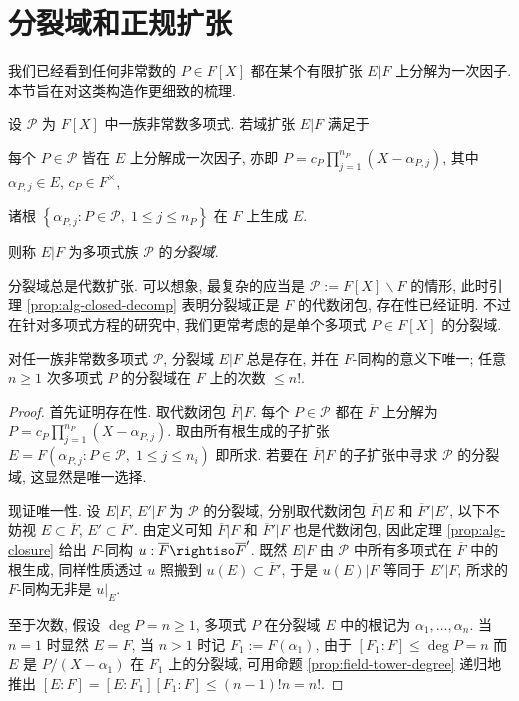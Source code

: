 \section{分裂域和正规扩张}\label{sec:splitting-field}
我们已经看到任何非常数的 $P \in F[X]$ 都在某个有限扩张 $E|F$ 上分解为一次因子. 本节旨在对这类构造作更细致的梳理.

\begin{definition}
	设 $\mathcal{P}$ 为 $F[X]$ 中一族非常数多项式. 若域扩张 $E|F$ 满足于
	\begin{compactitem}
		\item 每个 $P \in \mathcal{P}$ 皆在 $E$ 上分解成一次因子, 亦即 $P = c_P \prod_{j=1}^{n_P}(X - \alpha_{P,j})$, 其中 $\alpha_{P,j} \in E$, $c_P \in F^\times$,
		\item 诸根 $\left\{ \alpha_{P,j} : P \in \mathcal{P},\; 1 \leq j \leq n_P \right\}$ 在 $F$ 上生成 $E$.
	\end{compactitem}
	则称 $E|F$ 为多项式族 $\mathcal{P}$ 的\emph{分裂域}.
\end{definition}
分裂域总是代数扩张. 可以想象, 最复杂的应当是 $\mathcal{P} := F[X] \smallsetminus F$ 的情形, 此时引理 \ref{prop:alg-closed-decomp} 表明分裂域正是 $F$ 的代数闭包, 存在性已经证明. 不过在针对多项式方程的研究中, 我们更常考虑的是单个多项式 $P \in F[X]$ 的分裂域.

\begin{proposition}
	对任一族非常数多项式 $\mathcal{P}$, 分裂域 $E|F$ 总是存在, 并在 $F$-同构的意义下唯一; 任意 $n \geq 1$ 次多项式 $P$ 的分裂域在 $F$ 上的次数 $\leq n!$.
\end{proposition}
\begin{proof}
	首先证明存在性. 取代数闭包 $\overline{F}|F$. 每个 $P \in \mathcal{P}$ 都在 $\overline{F}$ 上分解为 $P = c_P \prod_{j=1}^{n_P}(X - \alpha_{P,j})$. 取由所有根生成的子扩张 $E = F\left( \alpha_{P,j} : P \in \mathcal{P},\; 1 \leq j \leq n_i \right)$ 即所求. 若要在 $\overline{F}|F$ 的子扩张中寻求 $\mathcal{P}$ 的分裂域, 这显然是唯一选择.

	现证唯一性. 设 $E|F$, $E'|F$ 为 $\mathcal{P}$ 的分裂域, 分别取代数闭包 $\overline{F}|E$ 和 $\overline{F}'|E'$, 以下不妨视 $E \subset \overline{F}$, $E' \subset \overline{F}'$. 由定义可知 $\overline{F}|F$ 和 $\overline{F}'|F$ 也是代数闭包, 因此定理 \ref{prop:alg-closure} 给出 $F$-同构 $u: \overline{F} \rightiso \overline{F}'$. 既然 $E|F$ 由 $\mathcal{P}$ 中所有多项式在 $\overline{F}$ 中的根生成, 同样性质透过 $u$ 照搬到 $u(E) \subset \overline{F}'$, 于是 $u(E)|F$ 等同于 $E'|F$, 所求的 $F$-同构无非是 $u|_E$.

	至于次数, 假设 $\deg P = n \geq 1$, 多项式 $P$ 在分裂域 $E$ 中的根记为 $\alpha_1, \ldots, \alpha_n$. 当 $n=1$ 时显然 $E=F$, 当 $n>1$ 时记 $F_1 := F(\alpha_1)$, 由于 $[F_1:F] \leq \deg P = n$ 而 $E$ 是 $P/(X-\alpha_1)$ 在 $F_1$ 上的分裂域, 可用命题 \ref{prop:field-tower-degree} 递归地推出 $[E:F] = [E:F_1][F_1:F] \leq (n-1)! n = n!$.
\end{proof}

